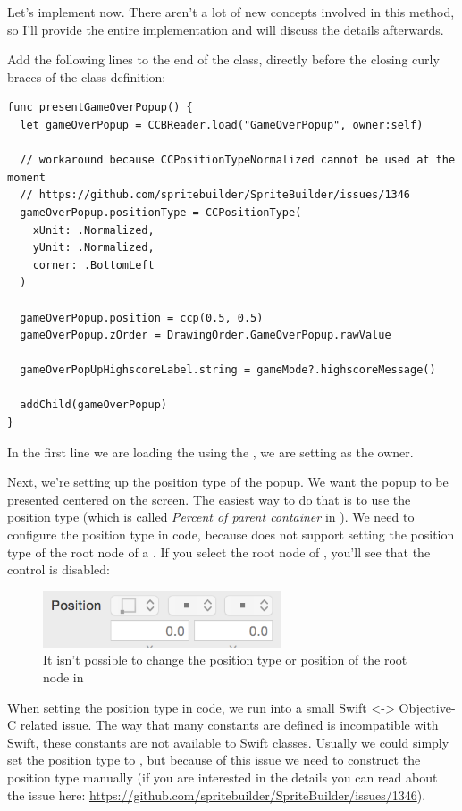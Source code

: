 Let's implement  now. There aren't a lot of
new concepts involved in this method, so I'll provide the entire implementation and
will discuss the details afterwards.

\begin{leftbar}
Add the following lines to the end of the  class,
directly before the closing curly braces of the class definition:
\begin{lstlisting}
func presentGameOverPopup() {
  let gameOverPopup = CCBReader.load("GameOverPopup", owner:self)
  
  // workaround because CCPositionTypeNormalized cannot be used at the moment
  // https://github.com/spritebuilder/SpriteBuilder/issues/1346
  gameOverPopup.positionType = CCPositionType(
    xUnit: .Normalized,
    yUnit: .Normalized,
    corner: .BottomLeft
  )
  
  gameOverPopup.position = ccp(0.5, 0.5)
  gameOverPopup.zOrder = DrawingOrder.GameOverPopup.rawValue
  
  gameOverPopUpHighscoreLabel.string = gameMode?.highscoreMessage()
  
  addChild(gameOverPopup)
}
\end{lstlisting}
\end{leftbar}
In the first line we are loading the  using the
, we are setting  as the owner.

Next, we're setting up the position type of the popup. We want the popup to be
presented centered on the screen. The easiest way to do that is to use the
 position type (which is called \textit{Percent of
parent container} in \SB{}). We need to configure the position type in code,
because \SB{} does not support setting the position type of the root node of a
\ccbfile{}. If you select the root node of ,
you'll see that the control is disabled:
\begin{figure}[H]
    \centering
    \includegraphics[width=200pt]{images/Chapter7/root_node_disabled_position_type.png}
    \caption{It isn't possible to change the position type or position of the
    root node in \SB{}}
\end{figure}
When setting the position type in code, we run into a small Swift <->
Objective-C related issue. The way that many \cocos{} constants are defined is
incompatible with Swift, these constants are not available to Swift classes.
Usually we could simply set the position type to
, but because of this issue we need to
construct the position type manually (if you are interested in the details you
can read about
the issue
here: \url{https://github.com/spritebuilder/SpriteBuilder/issues/1346}).

